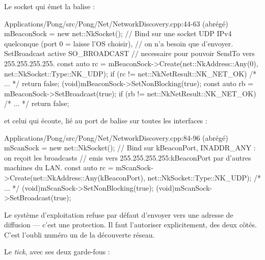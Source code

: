 Le socket qui émet la balise :

\begin{nkcode}{Applications/Pong/src/Pong/Net/NetworkDiscovery.cpp:44-63 (abrégé)}
            mBeaconSock = new net::NkSocket();
            // Bind sur une socket UDP IPv4 quelconque (port 0 = laisse l'OS choisir),
            // on n'a besoin que d'envoyer. SetBroadcast active SO_BROADCAST
            // necessaire pour pouvoir SendTo vers 255.255.255.255.
            const auto rc = mBeaconSock->Create(net::NkAddress::Any(0), net::NkSocket::Type::NK_UDP);
            if (rc != net::NkNetResult::NK_NET_OK) { /* ... */ return false; }
            (void)mBeaconSock->SetNonBlocking(true);
            const auto rb = mBeaconSock->SetBroadcast(true);
            if (rb != net::NkNetResult::NK_NET_OK) { /* ... */ return false; }
\end{nkcode}

et celui qui écoute, lié au port de balise sur toutes les interfaces :

\begin{nkcode}{Applications/Pong/src/Pong/Net/NetworkDiscovery.cpp:84-96 (abrégé)}
            mScanSock = new net::NkSocket();
            // Bind sur kBeaconPort, INADDR_ANY : on reçoit les broadcasts
            // emis vers 255.255.255.255:kBeaconPort par d'autres machines du LAN.
            const auto rc = mScanSock->Create(net::NkAddress::Any(kBeaconPort), net::NkSocket::Type::NK_UDP);
            /* ... */
            (void)mScanSock->SetNonBlocking(true);
            (void)mScanSock->SetBroadcast(true);
\end{nkcode}

\begin{nkpiege}
Le système d'exploitation refuse par défaut d'envoyer vers une adresse de
diffusion — c'est une protection. Il faut l'autoriser explicitement, des deux
côtés. C'est l'oubli numéro un de la découverte réseau.
\end{nkpiege}

Le \emph{tick}, avec ses deux garde-fous :

